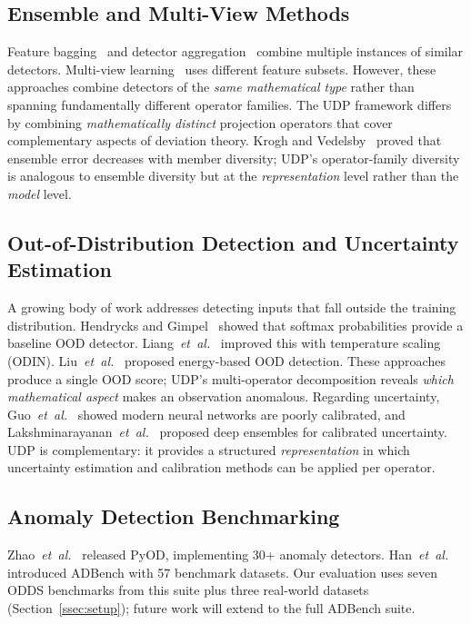 \documentclass[journal]{IEEEtran}
\newcommand{\etal}{\textit{et~al.}}
\begin{document}
\subsection{Ensemble and Multi-View Methods}

Feature bagging~\cite{lazarevic2005feature} and detector aggregation~\cite{aggarwal2015theoretical} combine multiple instances of similar detectors. Multi-view learning~\cite{zhao2015multi} uses different feature subsets. However, these approaches combine detectors of the \textit{same mathematical type} rather than spanning fundamentally different operator families. The UDP framework differs by combining \textit{mathematically distinct} projection operators that cover complementary aspects of deviation theory. Krogh and Vedelsby~\cite{krogh1995neural} proved that ensemble error decreases with member diversity; UDP's operator-family diversity is analogous to ensemble diversity but at the \textit{representation} level rather than the \textit{model} level.

\subsection{Out-of-Distribution Detection and Uncertainty Estimation}

A growing body of work addresses detecting inputs that fall outside the training distribution. Hendrycks and Gimpel~\cite{hendrycks2017baseline} showed that softmax probabilities provide a baseline OOD detector. Liang~\etal~\cite{liang2018odin} improved this with temperature scaling (ODIN). Liu~\etal~\cite{liu2020energy} proposed energy-based OOD detection. These approaches produce a single OOD score; UDP's multi-operator decomposition reveals \textit{which mathematical aspect} makes an observation anomalous. Regarding uncertainty, Guo~\etal~\cite{guo2017calibration} showed modern neural networks are poorly calibrated, and Lakshminarayanan~\etal~\cite{lakshminarayanan2017ensembles} proposed deep ensembles for calibrated uncertainty. UDP is complementary: it provides a structured \textit{representation} in which uncertainty estimation and calibration methods can be applied per operator.

\subsection{Anomaly Detection Benchmarking}

Zhao~\etal~\cite{zhao2019pyod} released PyOD, implementing 30+ anomaly detectors. Han~\etal~\cite{han2022adbench} introduced ADBench with 57 benchmark datasets. Our evaluation uses seven ODDS benchmarks from this suite plus three real-world datasets (Section~\ref{ssec:setup}); future work will extend to the full ADBench suite.
\end{document}
